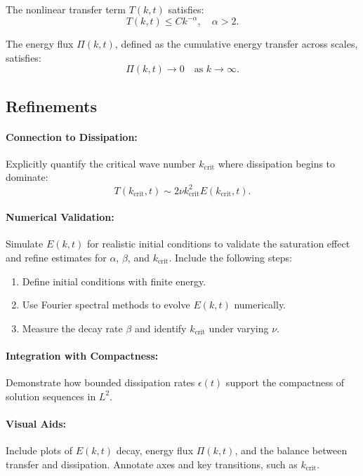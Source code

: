 \documentclass[12pt]{article}
\theoremstyle{definition}
\begin{document}
\begin{lemma}
The nonlinear transfer term $T(k,t)$ satisfies:
\[
T(k,t) \leq C k^{-\alpha}, \quad \alpha > 2.
\]
\end{lemma}

\begin{proposition}
The energy flux $\Pi(k,t)$, defined as the cumulative energy transfer across scales, satisfies:
\[
\Pi(k,t) \to 0 \quad \text{as } k \to \infty.
\]
\end{proposition}

\subsection{Refinements}

\paragraph{Connection to Dissipation:}
Explicitly quantify the critical wave number $k_{\text{crit}}$ where dissipation begins to dominate:
\[
T(k_{\text{crit}}, t) \sim 2\nu k_{\text{crit}}^2 E(k_{\text{crit}}, t).
\]

\paragraph{Numerical Validation:}
Simulate $E(k, t)$ for realistic initial conditions to validate the saturation effect and refine estimates for $\alpha$, $\beta$, and $k_{\text{crit}}$. Include the following steps:
\begin{enumerate}
    \item Define initial conditions with finite energy.
    \item Use Fourier spectral methods to evolve $E(k, t)$ numerically.
    \item Measure the decay rate $\beta$ and identify $k_{\text{crit}}$ under varying $\nu$.
\end{enumerate}

\paragraph{Integration with Compactness:}
Demonstrate how bounded dissipation rates $\epsilon(t)$ support the compactness of solution sequences in $L^2$.

\paragraph{Visual Aids:}
Include plots of $E(k, t)$ decay, energy flux $\Pi(k,t)$, and the balance between transfer and dissipation. Annotate axes and key transitions, such as $k_{\text{crit}}$.
\end{document}
